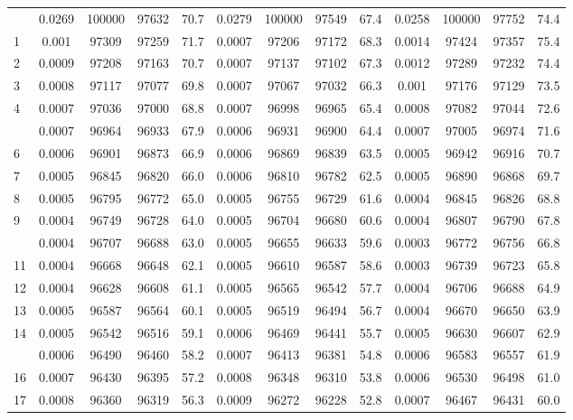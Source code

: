 \documentclass[
  14pt,
]{article}
\begin{document}
\begin{longtable}[t]{lcccccccccccc}
\endfoot
\bottomrule
\endlastfoot
0 & 0.0269 & 100000 & 97632 & 70.7 & 0.0279 & 100000 & 97549 & 67.4 & 0.0258 & 100000 & 97752 & 74.4\\
1 & 0.001 & 97309 & 97259 & 71.7 & 0.0007 & 97206 & 97172 & 68.3 & 0.0014 & 97424 & 97357 & 75.4\\
2 & 0.0009 & 97208 & 97163 & 70.7 & 0.0007 & 97137 & 97102 & 67.3 & 0.0012 & 97289 & 97232 & 74.4\\
3 & 0.0008 & 97117 & 97077 & 69.8 & 0.0007 & 97067 & 97032 & 66.3 & 0.001 & 97176 & 97129 & 73.5\\
4 & 0.0007 & 97036 & 97000 & 68.8 & 0.0007 & 96998 & 96965 & 65.4 & 0.0008 & 97082 & 97044 & 72.6\\
\addlinespace
5 & 0.0007 & 96964 & 96933 & 67.9 & 0.0006 & 96931 & 96900 & 64.4 & 0.0007 & 97005 & 96974 & 71.6\\
6 & 0.0006 & 96901 & 96873 & 66.9 & 0.0006 & 96869 & 96839 & 63.5 & 0.0005 & 96942 & 96916 & 70.7\\
7 & 0.0005 & 96845 & 96820 & 66.0 & 0.0006 & 96810 & 96782 & 62.5 & 0.0005 & 96890 & 96868 & 69.7\\
8 & 0.0005 & 96795 & 96772 & 65.0 & 0.0005 & 96755 & 96729 & 61.6 & 0.0004 & 96845 & 96826 & 68.8\\
9 & 0.0004 & 96749 & 96728 & 64.0 & 0.0005 & 96704 & 96680 & 60.6 & 0.0004 & 96807 & 96790 & 67.8\\
\addlinespace
10 & 0.0004 & 96707 & 96688 & 63.0 & 0.0005 & 96655 & 96633 & 59.6 & 0.0003 & 96772 & 96756 & 66.8\\
11 & 0.0004 & 96668 & 96648 & 62.1 & 0.0005 & 96610 & 96587 & 58.6 & 0.0003 & 96739 & 96723 & 65.8\\
12 & 0.0004 & 96628 & 96608 & 61.1 & 0.0005 & 96565 & 96542 & 57.7 & 0.0004 & 96706 & 96688 & 64.9\\
13 & 0.0005 & 96587 & 96564 & 60.1 & 0.0005 & 96519 & 96494 & 56.7 & 0.0004 & 96670 & 96650 & 63.9\\
14 & 0.0005 & 96542 & 96516 & 59.1 & 0.0006 & 96469 & 96441 & 55.7 & 0.0005 & 96630 & 96607 & 62.9\\
\addlinespace
15 & 0.0006 & 96490 & 96460 & 58.2 & 0.0007 & 96413 & 96381 & 54.8 & 0.0006 & 96583 & 96557 & 61.9\\
16 & 0.0007 & 96430 & 96395 & 57.2 & 0.0008 & 96348 & 96310 & 53.8 & 0.0006 & 96530 & 96498 & 61.0\\
17 & 0.0008 & 96360 & 96319 & 56.3 & 0.0009 & 96272 & 96228 & 52.8 & 0.0007 & 96467 & 96431 & 60.0\\

\end{longtable}
\end{document}
